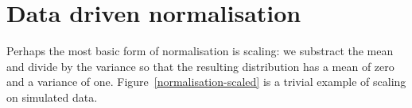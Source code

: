 
\section{Data driven normalisation}

Perhaps the most basic form of normalisation is scaling: we substract the mean and divide by the variance so that the resulting distribution has a mean of zero and a variance of one.
Figure~\ref{normalisation-scaled} is a trivial example of scaling on simulated data.

